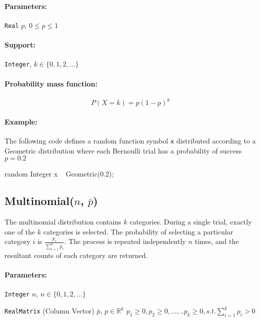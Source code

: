 \paragraph*{Parameters:} 
\begin{itemize*}
\item[] \verb|Real|
 $p$, $0 \leq p \leq 1$ 
\end{itemize*}
\paragraph*{Support:} \verb|Integer|, $k \in \{0, 1, 2, \ldots \}$ 

\paragraph*{Probability mass function:}
\[
	P(X = k) = p(1-p)^{k}
\]

\paragraph*{Example:}
The following code defines a random function symbol \verb|x| distributed according to a Geometric distribution where each Bernoulli trial has a probability of success $p = 0.2$
\begin{blogcode}
random Integer x ~ Geometric(0.2);
\end{blogcode}

\subsection{Multinomial($n$, $\bar{p}$)}
 The multinomial distribution contains $k$ categories. During a single trial, exactly one of the $k$ categories is selected. The probability of selecting a particular category $i$ is $\frac{p_{i}}{\sum_{i=1}^{k} p_{i}}$. The process is repeated independently $n$ times, and the resultant counts of each category are returned.
 
\paragraph*{Parameters:} 
\begin{itemize*}
\item[] \verb|Integer| $n$, $n \in \{0, 1, 2, \ldots \}$
\item[] \verb|RealMatrix| (Column Vector) $\bar{p}$, $p \in \mathbb{R}^{k}$ $p_{1} \geq 0, p_{2} \geq 0, \ldots, .. p_{k} \geq 0, s.t. \sum_{i=1}^{k} p_{i} > 0$
\end{itemize*}

